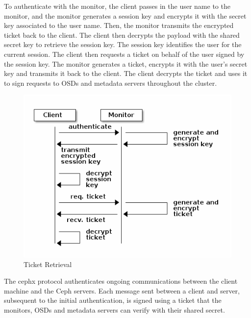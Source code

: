 \documentclass[12pt,a4paper]{report}
\begin{document}
To authenticate with the monitor, the client passes in the user name to the
monitor, and the monitor generates a session key and encrypts it with the
secret key associated to the user name. Then, the monitor transmits the
encrypted ticket back to the client. The client then decrypts the payload with
the shared secret key to retrieve the session key. The session key identifies
the user for the current session. The client then requests a ticket on behalf
of the user signed by the session key. The monitor generates a ticket, encrypts
it with the user’s secret key and transmits it back to the client. The client
decrypts the ticket and uses it to sign requests to OSDs and metadata servers
throughout the cluster.

\begin{figure}[h]
	\includegraphics[scale=0.75]{ticket_retrieval.png}
	\caption{Ticket Retrieval}
	\label{fig:ticket_retrieval}
\end{figure}

The cephx protocol authenticates ongoing communications between the client
machine and the Ceph servers. Each message sent between a client and server,
subsequent to the initial authentication, is signed using a ticket that the
monitors, OSDs and metadata servers can verify with their shared secret.
\end{document}
